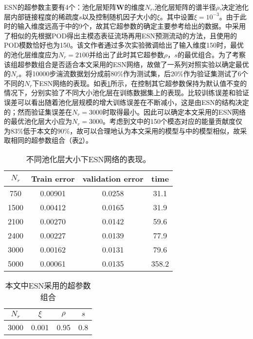 ESN的超参数主要有4个：池化层矩阵$\bm W$的维度$N_{r}$,池化层矩阵的谱半径$\rho$,决定池化层内部链接程度的稀疏度$s$以及控制随机因子大小的$\xi$。其中设置$\xi = 10^{-3}$。由于此时的输入维度远高于\cite{Anton2023}中的9个，故其它超参数的确定主要参考\cite{Pandey2020}给出的数据。\cite{Pandey2020}中采用了相似的先根据POD得出主模态表征流场再用ESN预测流动的方法，且使用的POD模数恰好也为150。该文作者通过多次实验微调给出了输入维度150时，最优的池化层维度应为$N_{r}=2100$并给出了此时其它超参数$\rho$，$s$的最优组合。为了考察该组超参数组合是否适合本文采用的ESN网络，故做了一系列对照实验以确定最优的$N_{r}$。将10000步湍流数据划分成前80\%作为测试集，后20\%作为验证集测试了6个不同的$N_{r}$下ESN网络的表现。如表\ref{tab:hyper_parameter}所示，在控制其它超参数保持为默认值不变的情况下，分别实验了不同大小池化层在训练数据集上的表现。比较训练误差和验证误差可以看出随着池化层规模的增大训练误差在不断减小，这是由ESN的结构决定的；然而验证集误差在$N_{r} = 3000$时取得最小。因此可以确定本文采用的ESN网络的最优池化层大小应为$N_{r} = 3000$。考虑到文中的150个模态对应的能量贡献度仅为$83\%$低于本文的$90\%$，故可以合理地认为本文采用的模型与\cite{Pandey2020}中的模型相似，故采取相同的超参数组合（表\ref{tab:optim_parameter}）。

\begin{table}
\centering
\begin{tabular}{c|c|c|c}
\textbf{$N_{r}$} & \textbf{Train error} & \textbf{validation error} & \textbf{time}\\
\hline
750  & 0.00901 & 0.0258 & 31.1\\
1500 & 0.00412 & 0.0165 & 31.9\\
2100 & 0.00270 & 0.0142 & 59.6\\
2400 & 0.00227 & 0.0139 & 77.9\\
3000 & 0.00162 & 0.0131 & 79.6\\
5000 & 0.00061 & 0.0135 & 358.2\\
\end{tabular}
\label{tab:hyper_parameter}
\caption{不同池化层大小下ESN网络的表现。}
\end{table}

\begin{table}
\centering
\begin{tabular}{c|c|c|c}
\textbf{$N_{r}$} & \textbf{$\xi$} & \textbf{$\rho$} & \textbf{$s$}\\
\hline
3000 & 0.001 & 0.95 & 0.8 \\
\end{tabular}
\caption{\label{tab:optim_parameter}本文中ESN采用的超参数组合}
\end{table}

